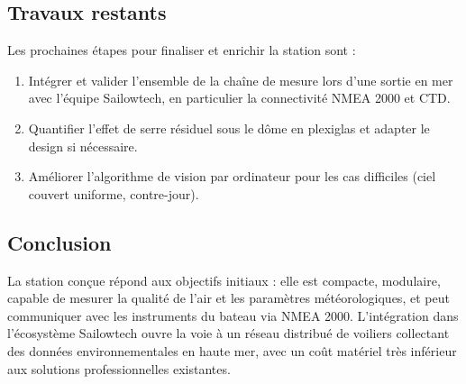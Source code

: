 \subsection{Travaux restants}

Les prochaines étapes pour finaliser et enrichir la station sont :

\begin{enumerate}
  \item Intégrer et valider l'ensemble de la chaîne de mesure lors d'une
    sortie en mer avec l'équipe Sailowtech, en particulier la connectivité
    NMEA 2000 et CTD.
  \item Quantifier l'effet de serre résiduel sous le dôme en plexiglas et
    adapter le design si nécessaire.
  \item Améliorer l'algorithme de vision par ordinateur pour les cas
    difficiles (ciel couvert uniforme, contre-jour).
\end{enumerate}

\subsection{Conclusion}

La station conçue répond aux objectifs initiaux : elle est compacte,
modulaire, capable de mesurer la qualité de l'air et les paramètres
météorologiques, et peut communiquer avec les instruments du bateau via
NMEA 2000. L'intégration dans l'écosystème Sailowtech ouvre la voie à
un réseau distribué de voiliers collectant des données environnementales
en haute mer, avec un coût matériel très inférieur aux solutions
professionnelles existantes.
